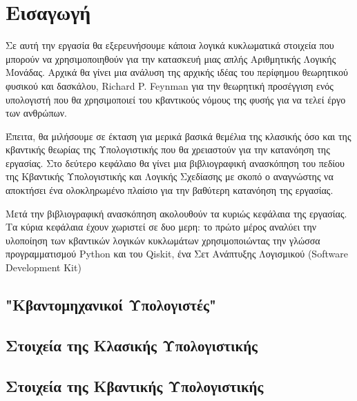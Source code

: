 \chapter{Εισαγωγή}

Σε αυτή την εργασία θα εξερευνήσουμε κάποια λογικά κυκλωματικά στοιχεία που μπορούν να χρησιμοποιηθούν για την κατασκευή μιας απλής Αριθμητικής
Λογικής Μονάδας. Αρχικά θα γίνει μια ανάλυση της αρχικής ιδέας του περίφημου θεωρητικού φυσικού και δασκάλου, Richard P. Feynman
για την θεωρητική προσέγγιση ενός υπολογιστή που θα χρησιμοποιεί του κβαντικούς νόμους της φυσής για να τελεί έργο των ανθρώπων.

Έπειτα, θα μιλήσουμε σε έκταση για μερικά βασικά θεμέλια της κλασικής όσο και της κβαντικής θεωρίας της Υπολογιστικής που θα χρειαστούν για την
κατανόηση της εργασίας. Στο δεύτερο κεφάλαιο θα γίνει μια βιβλιογραφική ανασκόπηση του πεδίου της Κβαντικής Υπολογιστικής και Λογικής Σχεδίασης
με σκοπό ο αναγνώστης να αποκτήσει ένα ολοκληρωμένο πλαίσιο για την βαθύτερη κατανόηση της εργασίας.

Μετά την βιβλιογραφική ανασκόπηση ακολουθούν τα κυριώς κεφάλαια της εργασίας. Τα κύρια κεφάλαια έχουν χωριστεί σε δυο μερη: το πρώτο μέρος αναλύει
την υλοποίηση των κβαντικών λογικών κυκλωμάτων χρησιμοποιώντας την γλώσσα προγραμματισμού Python και του Qiskit, ένα Σετ Ανάπτυξης Λογισμικού
(Software Development Kit)

\section{"Κβαντομηχανικοί Υπολογιστές"}

\section{Στοιχεία της Κλασικής Υπολογιστικής}

\section{Στοιχεία της Κβαντικής Υπολογιστικής}
